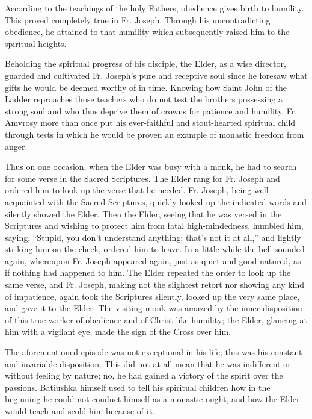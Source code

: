 According to the teachings of the holy Fathers, obedience gives birth to humility. This proved completely true in Fr. Joseph. Through his uncontradicting obedience, he attained to that humility which subsequently raised him to the spiritual heights.

Beholding the spiritual progress of his disciple, the Elder, as a wise director, guarded and cultivated Fr. Joseph's pure and receptive soul since he foresaw what gifts he would be deemed worthy of in time. Knowing how Saint John of the Ladder reproaches those teachers who do not test the brothers possessing a strong soul and who thus deprive them of crowns for patience and humility, Fr. Amvrosy more than once put his ever-faithful and stout-hearted spiritual child through tests in which he would be proven an example of monastic freedom from anger.

Thus on one occasion, when the Elder was busy with a monk, he had to search for some verse in the Sacred Scriptures. The Elder rang for Fr. Joseph and ordered him to look up the verse that he needed. Fr. Joseph, being well acquainted with the Sacred Scriptures, quickly looked up the indicated words and silently showed the Elder. Then the Elder, seeing that he was versed in the Scriptures and wishing to protect him from fatal high-mindedness, humbled him, saying, “Stupid, you don't understand anything; that's not it at all,” and lightly striking him on the cheek, ordered him to leave. In a little while the bell sounded again, whereupon Fr. Joseph appeared again, just as quiet and good-natured, as if nothing had happened to him. The Elder repeated the order to look up the same verse, and Fr. Joseph, making not the slightest retort nor showing any kind of impatience, again took the Scriptures silently, looked up the very same place, and gave it to the Elder. The visiting monk was amazed by the inner disposition of this true worker of obedience and of Christ-like humility; the Elder, glancing at him with a vigilant eye, made the sign of the Cross over him.

The aforementioned episode was not exceptional in his life; this was his constant and invariable disposition. This did not at all mean that he was indifferent or without feeling by nature; no, he had gained a victory of the spirit over the passions. Batiushka himself used to tell his spiritual children how in the beginning he could not conduct himself as a monastic ought, and how the Elder would teach and scold him because of it.


